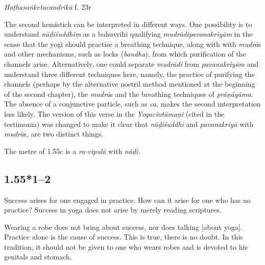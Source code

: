 \begin{ekdosis}
\begin{testimonia}[hp01_055]
\emph{Haṭhasaṅketacandrikā} f. 23r

\begin{versinnote}
\tl{\var{nāḍiśuddhiṃ ] \emph{em.}, nāhiśuddhi ms. no. 2244}\\!}
\end{versinnote}

\end{testimonia}

\begin{philcomm}[hp01_055]
The second hemistich can be interpreted in different ways. One possibility is to understand \emph{nāḍiśuddhiṃ} as a bahuvrīhi qualifying \emph{mudrādipavanakriyām} in the sense that the yogi should practise a breathing technique, along with with \emph{mudrā}s and other mechanisms, such as locks (\emph{bandha}), from which purification of the channels arise. Alternatively, one could separate \emph{mudrādi} from \emph{pavanakriyām} and understand three different techniques here, namely, the practice of purifying the channels (perhaps by the alternative nostril method mentioned at the beginning of the second chapter), the \emph{mudrā}s and the breathing techniques of \emph{prāṇāyāma}. The absence of a conjunctive particle, such as \emph{ca}, makes the second interpretation less likely. The version of this verse in the \emph{Yogacintāmaṇi} (cited in the testimonia) was changed to make it clear that \emph{nāḍiśuddhi} and \emph{pavanakriyā} with \emph{mudrā}s, are two distinct things. 

The metre of 1.55c is a \emph{ra-vipulā} with \emph{nāḍi}.
\end{philcomm}

\subsection*{1.55*1--2}
\begin{translation}[hp01_055_1]
Success arises for one engaged in practice. How can it arise for one who has no practice? Success in yoga does not arise by merely reading scriptures.
\end{translation}

\begin{translation}[hp01_055_2]
Wearing a robe does not bring about success, nor does talking [about yoga]. Practice alone is the cause of success. This is true, there is no doubt. In this tradition, it should not be given to one who wears robes and is devoted to his genitals and stomach.
\end{translation}


\end{ekdosis}
